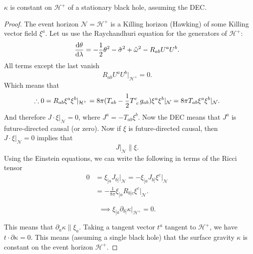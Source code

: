 \begin{theorem}
  $\kappa$ is constant on $\mathcal{H}^+$ of a stationary black hole, assuming the DEC.
\end{theorem}
\begin{proof}
  The event horizon $\mathcal{N} = \mathcal{H}^+$ is a Killing horizon (Hawking) of some Killing vector field $\xi^{a}$.
  Let us use the Raychandhuri equation for the generators of $\mathcal{H}^+$:
  \begin{equation}
    \dv{\theta}{\lambda} = -\frac{1}{2} \theta^2 - \hat{\sigma}^2 + \hat{\omega}^2 - R_{ab} U^{a} U^{b}.
  \end{equation}
  All terms except the last vanish
  \begin{equation}
    R_{ab} U^{a} U^{b} \rvert_{\mathcal{H}^+} = 0.
  \end{equation}
  Which means that
  \begin{equation}
    \therefore 0 = R_{ab} \xi^{a} \xi^{b} \rvert_{\mathcal{H}^+} = 8 \pi (T_{ab} - \frac{1}{2} T\indices{^{c}_{c}} g_{ab}) \xi^{a} \xi^{b} \rvert_{\mathcal{N}} = 8 \pi T_{ab} \xi^{a} \xi^{b} \rvert_\mathcal{N}.
  \end{equation}
  And therefore $J \cdot \xi\rvert_\mathcal{N} = 0$, where $J^{a} = -T_{ab} \xi^{b}$. Now the DEC means that $J^{a}$ is future-directed causal (or zero).
  Now if $\xi$ is future-directed causal, then $J \cdot \xi \rvert_\mathcal{N} = 0$ implies that 
  \begin{equation}
    J\rvert_\mathcal{N} \parallel \xi.
  \end{equation}
  Using the Einstein equations, we can write the following in terms of the Ricci tensor
  \begin{align}
    0 &= \xi_{[a} J_{b]} \rvert_\mathcal{N} = - \xi_{[a} J_{b]} \xi^{c} \rvert_\mathcal{N} \\
      &= -\frac{1}{8 \pi} \xi_{[a} R_{b] c} \xi^{c} \rvert_\mathcal{N}.
  \end{align}
  \begin{exercise}[Sheet 4]
    \begin{equation}
      \implies \xi_{[a} \partial_{b]} \kappa \rvert_{\mathcal{H}^+} = 0.
    \end{equation}
  \end{exercise}
  This means that $\partial_{a} \kappa \parallel \xi_{a}$. Taking a tangent vector $t^{a}$ tangent to $\mathcal{H}^+$, we have $t \cdot \partial \kappa = 0$.
  This means (assuming a single black hole) that the surface gravity $\kappa$ is constant on the event horizon $\mathcal{H}^+$.
\end{proof}

